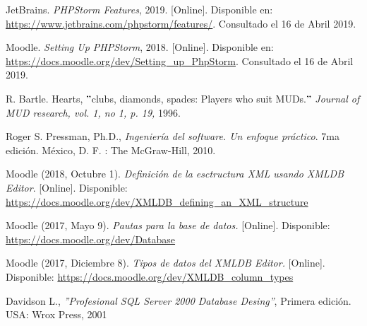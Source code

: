 \begin{thebibliography}{9}
        JetBrains. {\it PHPStorm Features}, 2019. [Online]. Disponible en: \url{https://www.jetbrains.com/phpstorm/features/}. Consultado el 16 de Abril 2019.
    
        Moodle. {\it Setting Up PHPStorm}, 2018. [Online]. Disponible en: \url{https://docs.moodle.org/dev/Setting_up_PhpStorm}. Consultado el 16 de Abril 2019.
    
    

        R. Bartle. Hearts, 
        $"$clubs, diamonds, spades: Players who suit MUDs.$"$
        \textit{Journal of MUD research, vol. 1, no 1, p. 19,} 1996.    
    
    
    
    
    
        Roger S. Pressman, Ph.D., \textit{Ingeniería del software. Un enfoque práctico}. 7ma edición. México, D. F. : The McGraw-Hill, 2010. 
    
         Moodle  (2018, Octubre 1).\textit{ Definición de la esctructura XML usando XMLDB Editor}.  [Online]. Disponible: \url{ https://docs.moodle.org/dev/XMLDB_defining_an_XML_structure}   
     
     
          Moodle (2017, Mayo 9). \textit{Pautas para la base de datos.} [Online]. Disponible: \url{https://docs.moodle.org/dev/Database}
    
        Moodle  (2017, Diciembre 8). \textit{Tipos de datos del XMLDB Editor.} [Online]. Disponible: \url{https://docs.moodle.org/dev/XMLDB_column_types}
  
        Davidson L., \textit{''Profesional SQL Server 2000 Database Desing''}, Primera edición. USA: Wrox Press, 2001
  

\end{thebibliography}
